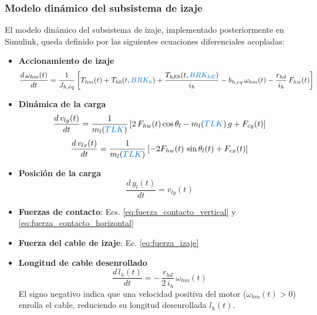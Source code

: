 \documentclass{article}
\begin{document}
\subsubsection{Modelo dinámico del subsistema de izaje}
El modelo dinámico del subsistema de izaje, implementado posteriormente en Simulink, queda definido por las siguientes ecuaciones diferenciales acopladas:
\begin{itemize}
    \item \textbf{Accionamiento de izaje}
    \begin{equation}
        \frac{d\,\omega_{hm}(t)}{dt}
        = \frac{1}{J_{h,eq}}
        \left[
            T_{hm}(t)
            + T_{hb}(t,\textcolor{signalcolor}{BRK_h})
            + \frac{T_{hEb}(t,\textcolor{signalcolor}{BRK_{hE}})}{i_h}
            - b_{h,eq}\,\omega_{hm}(t)
            - \frac{r_{hd}}{i_h} \, F_{hw}(t)
        \right]
        \label{eq:dinamica_motor_izaje_final}
    \end{equation}
    \item \textbf{Dinámica de la carga}
    \begin{equation}
        \frac{d\,v_{ly}(t)}{dt}
        = \frac{1}{m_l(\textcolor{signalcolor}{TLK})}
        \left[
            2\,F_{hw}(t)\cos\theta_l
            - m_l(\textcolor{signalcolor}{TLK})\,g
            + F_{cy}(t)
        \right]
    \end{equation}
    \begin{equation}
        \frac{d\,v_{lx}(t)}{dt}
        = \frac{1}{m_l(\textcolor{signalcolor}{TLK})}\left[-2 F_{hw}(t) \, \sin\theta_l(t) + F_{cx}(t)\right]
    \end{equation}
    \item \textbf{Posición de la carga}
    \begin{equation}
        \frac{d\,y_l(t)}{dt} = v_{ly}(t)
    \end{equation}
    \item \textbf{Fuerzas de contacto}: Ecs. \ref{eq:fuerza_contacto_vertical} y \ref{eq:fuerza_contacto_horizontal}
    \item \textbf{Fuerza del cable de izaje}: Ec. \ref{eq:fuerza_izaje}
    \item \textbf{Longitud de cable desenrollado}
    \begin{equation}
        \frac{d\,l_h(t)}{dt}
        = -\,\frac{r_{hd}}{2\,i_h}\,\omega_{hm}(t)
    \end{equation}
    El signo negativo indica que una velocidad positiva del motor ($\omega_{hm}(t) > 0$) enrolla el cable, reduciendo su longitud desenrollada $l_h(t)$.
\end{itemize}
\end{document}
